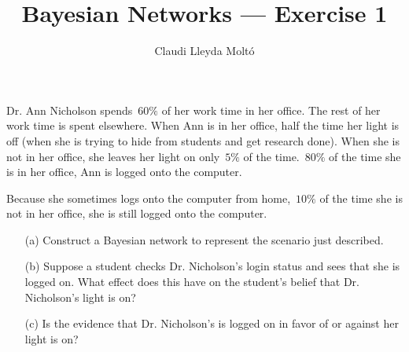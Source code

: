 \documentclass[a4paper]{article}
\title{Bayesian Networks --- Exercise 1}
\author{Claudi Lleyda Moltó}
\begin{document}
\maketitle

Dr. Ann Nicholson spends~\(60\%\) of her work time in her office. The rest of
her work time is spent elsewhere. When Ann is in her office, half the time her
light is off (when she is trying to hide from students and get research done).
When she is not in her office, she leaves her light on only~\(5\%\) of the
time.~\(80\%\) of the time she is in her office, Ann is logged onto the
computer.

Because she sometimes logs onto the computer from home,~\(10\%\) of the time she
is not in her office, she is still logged onto the computer.

\begin{enumerate}
    \item[(a)] Construct a Bayesian network to represent the scenario just
        described.
\end{enumerate}

\begin{enumerate}
    \item[(b)] Suppose a student checks Dr. Nicholson's login status and sees
        that she is logged on. What effect does this have on the student's
        belief that Dr. Nicholson's light is on?
\end{enumerate}

\begin{enumerate}
    \item[(c)] Is the evidence that Dr. Nicholson's is logged on in favor of or
        against her light is on?
\end{enumerate}
\end{document}
